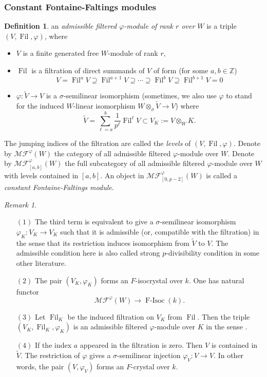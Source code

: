 \documentclass[12pt,twoside]{book}
\theoremstyle{plain}
\theoremstyle{definition}
\newtheorem{definition}[definition]{Definition}
\theoremstyle{remark}
\newtheorem{remark}[remark]{Remark}
\newcommand{\bZ}{{\mathbb Z}}
\DeclareMathOperator\Fil{Fil}
\newcommand{\MF}{\mathcal{MF}}
\DeclareMathOperator{\FIsoc}{F-Isoc}
\numberwithin{equation}{section}
\begin{document}
\subsubsection{Constant Fontaine-Faltings modules}

\begin{definition}
an \emph{admissible filtered $\varphi$-module of rank $r$ over $W$} is a triple $(V,\Fil,\varphi)$, where
\begin{itemize}
\item $V$ is a finite generated free $W$-module of rank $r$,
\item $\Fil$ is a filtration of direct summands of $V$ of form (for some $a,b\in\bZ$)
\[V = \Fil^aV \supseteq \Fil^{a+1}V \supseteq \cdots \supseteq \Fil^{b}V\supseteq \Fil^{b+1}V=0\]
\item $\varphi\colon \widetilde{V} \rightarrow V$ is a $\sigma$-semilinear isomorphism (sometimes, we also use $\varphi$ to stand for the induced $W$-linear isomorphism $W\otimes_{\sigma} \widetilde{V}\rightarrow V$) where
\[\widetilde{V}=\sum\limits_{\ell=a}^b\frac1{p^\ell} \Fil^\ell V \subset V_K:=V\otimes_WK.\]
\end{itemize}
The jumping indices of the filtration are called the \emph{levels} of $(V,\Fil,\varphi)$.
Denote by $\MF^{\varphi}(W)$ the category of all admissible filtered $\varphi$-module over $W$. Denote by $\MF_{[a,b]}^{\varphi}(W)$ the full subcategory of all admissible filtered $\varphi$-module over $W$ with levels contained in $[a,b]$. An object in $\MF_{[0,p-2]}^{\varphi}(W)$ is called a \emph{constant Fontaine-Faltings module}.
\end{definition}

\begin{remark}
\begin{enumerate}
\item[$(1)$] The third term is equivalent to give a $\sigma$-semilinear isomorphism $\varphi_K\colon V_K\rightarrow V_K$ such that it is admissible (or, compatible with the filtration) in the sense that its restriction induces isomorphism from $\widetilde{V}$ to $V$. The admissible condition here is also called strong $p$-divisibility condition in some other literature.
\item[$(2)$] The pair $(V_K,\varphi_K)$ forms an $F$-isocrystal over $k$. One has natural functor
\[\MF^\varphi(W) \rightarrow \FIsoc(k).\]
\item[$(3)$] Let $\Fil_K$ be the induced filtration on $V_K$ from $\Fil$. Then the triple $(V_K,\Fil_K,\varphi_K)$ is an admissible filtered $\varphi$-module over $K$ in the sense \cite{FoOu}.
\item[$(4)$] If the index $a$ appeared in the filtration is zero. Then $V$ is contained in $\widetilde{V}$. The restriction of $\varphi$ gives a $\sigma$-semilinear injection $\varphi_V\colon V\rightarrow V$. In other words, the pair $(V,\varphi_V)$ forms an $F$-crystal over $k$.
\end{enumerate}
\end{remark}
\end{document}
